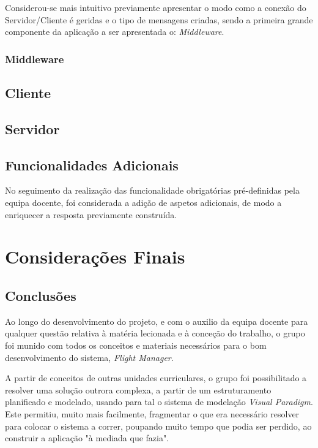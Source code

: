 \documentclass[a4paper,11pt]{scrreprt}
\begin{document}
Considerou-se mais intuitivo previamente apresentar o modo como a conexão do Servidor/Cliente é geridas e o tipo
de mensagens criadas, sendo a primeira grande componente da aplicação a ser apresentada o: \textit{Middleware}.

\subsection{Middleware}


\section{Cliente}


\section{Servidor}


\section{Funcionalidades Adicionais}

No seguimento da realização das funcionalidade obrigatórias pré-definidas pela equipa docente, 
foi considerada a adição de aspetos adicionais, de modo a enriquecer a resposta previamente 
construída.

\chapter{Considerações Finais}
\section{Conclusões}

Ao longo do desenvolvimento do projeto, e com o auxilio da equipa docente para qualquer questão 
relativa à matéria lecionada e à conceção do trabalho, o grupo foi munido com todos os conceitos
e materiais necessários para o bom desenvolvimento do sistema, \textit{Flight Manager}.

A partir de conceitos de outras unidades curriculares, o grupo foi possibilitado a resolver uma 
solução outrora complexa, a partir de um estruturamento planificado e modelado, usando para tal 
o sistema de modelação \textit{Visual Paradigm}.
Este permitiu, muito mais facilmente, fragmentar o que era necessário resolver para colocar o 
sistema a correr, poupando muito tempo que podia ser perdido, ao construir a aplicação "à mediada
que fazia".
\end{document}
